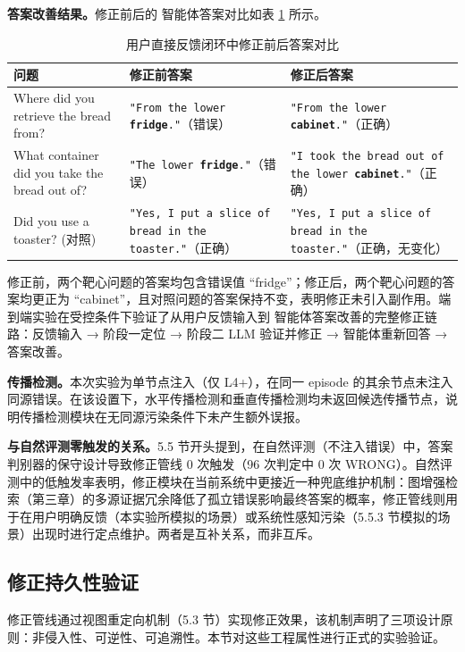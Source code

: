 \textbf{答案改善结果。}修正前后的 智能体答案对比如表 \ref{tab:5-4} 所示。

\begin{table}[htbp]
\centering
\small
\caption{用户直接反馈闭环中修正前后答案对比}
\label{tab:5-4}
\begin{tabular}{p{3.2cm}p{4.0cm}p{4.0cm}}
\toprule
问题 & 修正前答案 & 修正后答案 \\
\midrule
Where did you retrieve the bread from?
  & \texttt{"From the lower \textbf{fridge}."}（错误）
  & \texttt{"From the lower \textbf{cabinet}."}（正确） \\
What container did you take the bread out of?
  & \texttt{"The lower \textbf{fridge}."}（错误）
  & \texttt{"I took the bread out of the lower \textbf{cabinet}."}（正确） \\
Did you use a toaster? (对照)
  & \texttt{"Yes, I put a slice of bread in the toaster."}（正确）
  & \texttt{"Yes, I put a slice of bread in the toaster."}（正确，无变化） \\
\bottomrule
\end{tabular}
\end{table}

修正前，两个靶心问题的答案均包含错误值 “fridge”；修正后，两个靶心问题的答案均更正为 “cabinet”，且对照问题的答案保持不变，表明修正未引入副作用。端到端实验在受控条件下验证了从用户反馈输入到 智能体答案改善的完整修正链路：反馈输入 → 阶段一定位 → 阶段二 LLM 验证并修正 → 智能体重新回答 → 答案改善。

\textbf{传播检测。}本次实验为单节点注入（仅 L4+），在同一 episode 的其余节点未注入同源错误。在该设置下，水平传播检测和垂直传播检测均未返回候选传播节点，说明传播检测模块在无同源污染条件下未产生额外误报。

\textbf{与自然评测零触发的关系。}5.5 节开头提到，在自然评测（不注入错误）中，答案判别器的保守设计导致修正管线 0 次触发（96 次判定中 0 次 WRONG）。自然评测中的低触发率表明，修正模块在当前系统中更接近一种兜底维护机制：图增强检索（第三章）的多源证据冗余降低了孤立错误影响最终答案的概率，修正管线则用于在用户明确反馈（本实验所模拟的场景）或系统性感知污染（5.5.3 节模拟的场景）出现时进行定点维护。两者是互补关系，而非互斥。

\subsection{修正持久性验证}

修正管线通过视图重定向机制（5.3 节）实现修正效果，该机制声明了三项设计原则：非侵入性、可逆性、可追溯性。本节对这些工程属性进行正式的实验验证。

